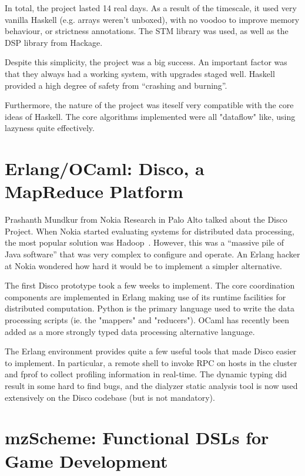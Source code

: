 \documentclass{jfp1}
\begin{document}
In total, the project lasted 14 real days. As a result of the timescale,
it used very vanilla Haskell (e.g. arrays weren't unboxed), with no
voodoo to improve memory behaviour, or strictness annotations. The STM
library was used, as well as the DSP library from Hackage.

Despite this simplicity, the project was a big success. An important
factor was that they always had a working system, with upgrades staged
well. Haskell provided a high degree of safety from ``crashing and
burning''.

Furthermore, the nature of the project was iteself very compatible with
the core ideas of Haskell. The core algorithms implemented were all
"dataflow" like, using lazyness quite effectively.

\section{Erlang/OCaml: Disco, a MapReduce Platform}

Prashanth Mundkur from Nokia Research in Palo Alto talked about the
Disco Project.  When Nokia started evaluating systems for distributed
data processing, the most popular solution was Hadoop~\cite{x}. However,
this was a ``massive pile of Java software'' that was very complex to
configure and operate. An Erlang hacker at Nokia wondered how hard it
would be to implement a simpler alternative.

The first Disco prototype took a few weeks to implement. The core
coordination components are implemented in Erlang making use of its
runtime facilities for distributed computation. Python is the primary
language used to write the data processing scripts (ie. the "mappers"
and "reducers"). OCaml has recently been added as a more strongly typed
data processing alternative language.

The Erlang environment provides quite a few useful tools that made Disco
easier to implement. In particular, a remote shell to invoke RPC on
hosts in the cluster and fprof to collect profiling information in
real-time. The dynamic typing did result in some hard to find bugs, and
the dialyzer static analysis tool is now used extensively on the Disco
codebase (but is not mandatory).

\section{mzScheme: Functional DSLs for Game Development}
\end{document}
